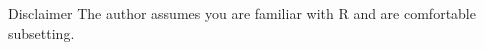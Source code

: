 
\normalfont
\begin{frame}
	\begin{center}
  		\begin{block}{Disclaimer} 
The author assumes you are familiar with \ttfamily R \normalfont and are comfortable subsetting. \\
		\end{block}
	\end{center} 
\end{frame}










